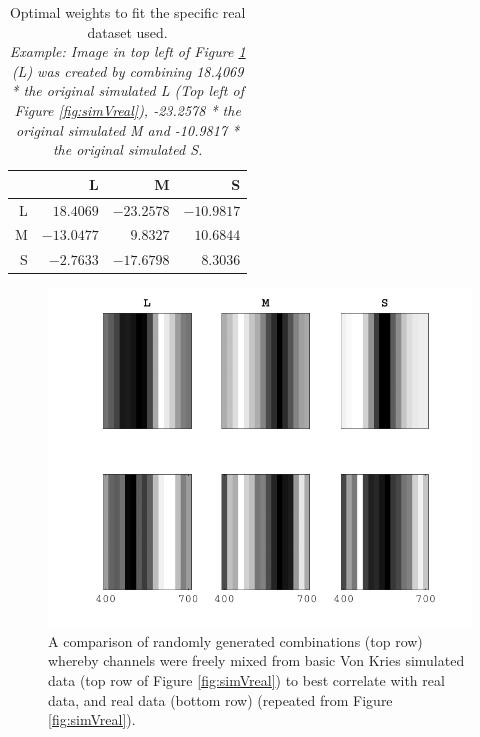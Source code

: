 \begin{table}[hbtp]
\centering
\begin{tabular}{|r|r|r|r|}
\hline
 & L & M & S \\ \hline
L & $18.4069$ & $-23.2578$ & $-10.9817$ \\ \hline
M & $-13.0477$ & $9.8327$ & $10.6844$ \\ \hline
S & $-2.7633$ & $-17.6798$ & $8.3036$ \\ \hline
\end{tabular} %
\caption{Optimal weights to fit the specific real dataset used. \\ \emph{Example: Image in top left of Figure \ref{fig:maxsimVreal} (L) was created by combining 18.4069 * the original simulated L (Top left of Figure \ref{fig:simVreal}), -23.2578 * the original simulated M and -10.9817 * the original simulated S.}}
\label{tab:crosscomb}
\end{table}

\begin{figure}[htbp]
\includegraphics[max width=\textwidth]{figs/LargeSphere/maxsimVreal.pdf}
\caption{A comparison of randomly generated combinations (top row) whereby channels were freely mixed from basic Von Kries simulated data (top row of Figure \ref{fig:simVreal}) to best correlate with real data, and real data (bottom row) (repeated from Figure \ref{fig:simVreal}).}
\label{fig:maxsimVreal}
\end{figure}


